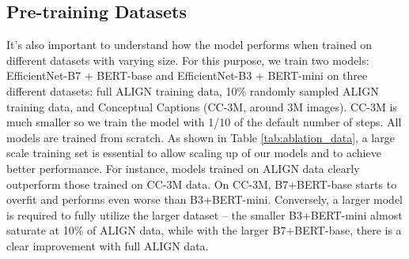 \documentclass{article}
\begin{document}
\vspace{-0.2cm}
\subsection{Pre-training Datasets}
It's also important to understand how the model performs when trained on different  datasets with varying size. For this purpose, we train two models: EfficientNet-B7 + BERT-base and EfficientNet-B3 + BERT-mini on three different datasets: full ALIGN training data, 10\% randomly sampled ALIGN training data, and Conceptual Captions (CC-3M, around 3M images). CC-3M is much smaller so we train the model with 1/10 of the default number of steps. All models are trained from scratch. As shown in Table \ref{tab:ablation_data}, a large scale training set is essential to allow scaling up of our models and to achieve better performance. For instance, models trained on ALIGN data clearly outperform those trained on CC-3M data. On CC-3M, B7+BERT-base starts to overfit and performs even worse than B3+BERT-mini. Conversely, a larger model is required to fully utilize the larger dataset -- the smaller B3+BERT-mini almost saturate at 10\% of ALIGN data, while with the larger B7+BERT-base, there is a clear improvement with full ALIGN data.

\begin{table}[h!]
\vspace{-5mm}
    \centering
    \small
    \caption{Ablation study of different training datasets.}
    \label{tab:ablation_data}
    \vspace{1mm}
\vspace{-5mm}
\end{table}
\end{document}
